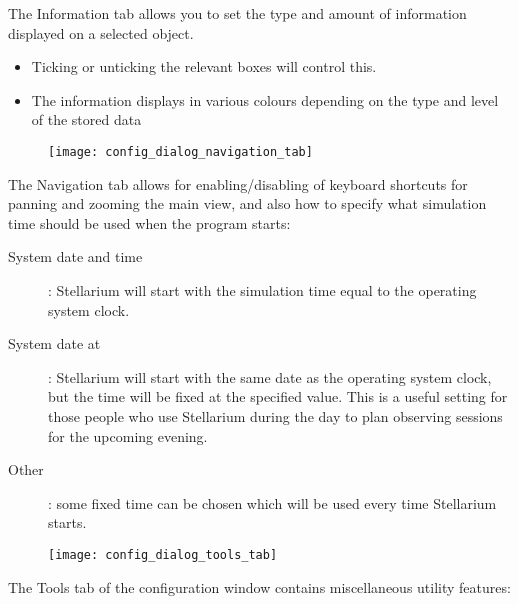 The Information tab allows you to set the type and amount of information
displayed on a selected object.
\begin{itemize}
\item Ticking or unticking the relevant boxes will control this.
\item The information displays in various colours depending on the type and
level of the stored data
\end{itemize}

\begin{figure}[h]
\centering\texttt{[image: config\_dialog\_navigation\_tab]}
\label{fig:gui:configuration:nav}
\end{figure}

The Navigation tab allows for enabling/disabling of keyboard shortcuts
for panning and zooming the main view, and also how to specify what
simulation time should be used when the program starts:

\begin{description}
\item[System date and time]: Stellarium will start with
  the simulation time equal to the operating system clock.
\item[System date at]: Stellarium will start with the
  same date as the operating system clock, but the time will be fixed at
  the specified value. This is a useful setting for those people who use
  Stellarium during the day to plan observing sessions for the upcoming
  evening.
\item[Other]: some fixed time can be chosen which will
  be used every time Stellarium starts.
\end{description}

\begin{figure}[h]
\centering\texttt{[image: config\_dialog\_tools\_tab]}
\end{figure}

The Tools tab of the configuration window contains miscellaneous utility
features:

